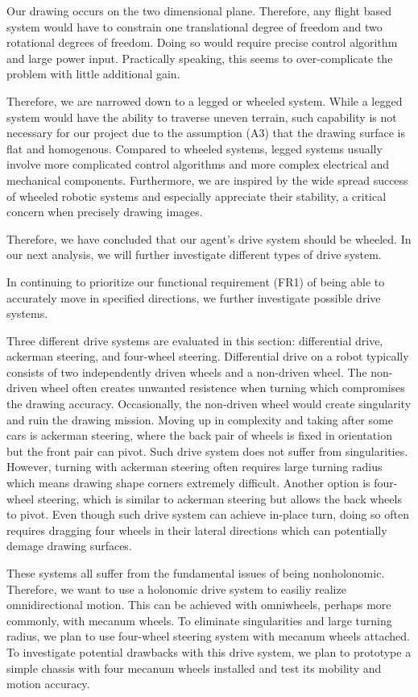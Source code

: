 Our drawing occurs on the two dimensional plane. Therefore, any flight based system would have to constrain one translational degree of freedom and two rotational degrees of freedom. Doing so would require precise control algorithm and large power input. Practically speaking, this seems to over-complicate the problem with little additional gain. 

Therefore, we are narrowed down to a legged or wheeled system. While a legged system would have the ability to traverse uneven terrain, such capability is not necessary for our project due to the assumption (A3) that the drawing surface is flat and homogenous. Compared to wheeled systems, legged systems usually involve more complicated control algorithms and more complex electrical and mechanical components. Furthermore, we are inspired by the wide spread success of wheeled robotic systems and especially appreciate their stability, a critical concern when precisely drawing images.

Therefore, we have concluded that our agent's drive system should be wheeled. In our next analysis, we will further investigate different types of drive system. 

In continuing to prioritize our functional requirement (FR1) of being able to accurately move in specified directions, we further investigate possible drive systems. 

Three different drive systems are evaluated in this section: differential drive, ackerman steering, and four-wheel steering. Differential drive on a robot typically consists of two independently driven wheels and a non-driven wheel. The non-driven wheel often creates unwanted resistence when turning which compromises the drawing accuracy. Occasionally, the non-driven wheel would create singularity and ruin the drawing mission. Moving up in complexity and taking after some cars is ackerman steering, where the back pair of wheels is fixed in orientation but the front pair can pivot. Such drive system does not suffer from singularities. However, turning with ackerman steering often requires large turning radius which means drawing shape corners extremely difficult. Another option is four-wheel steering, which is similar to ackerman steering but allows the back wheels to pivot. Even though such drive system can achieve in-place turn, doing so often requires dragging four wheels in their lateral directions which can potentially demage drawing surfaces.

These systems all suffer from the fundamental issues of being nonholonomic. Therefore, we want to use a holonomic drive system to easiliy realize omnidirectional motion. This can be achieved with omniwheels, perhaps more commonly, with mecanum wheels. To eliminate singularities and large turning radius, we plan to use four-wheel steering system with mecanum wheels attached. To investigate potential drawbacks with this drive system, we plan to prototype a simple chassis with four mecanum wheels installed and test its mobility and motion accuracy. 

